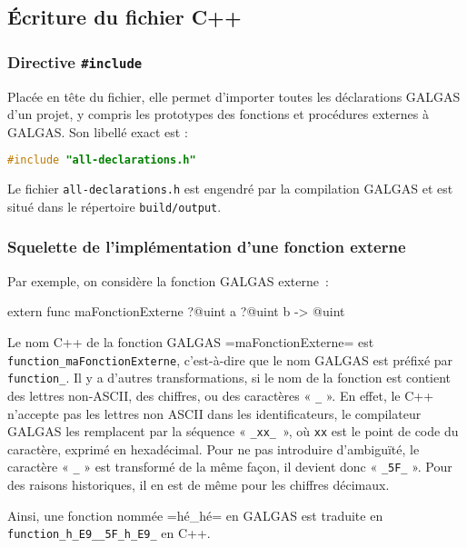 \subsection{Écriture du fichier C++}


\subsubsection{Directive \texttt{\#include}}

Placée en tête du fichier, elle permet d'importer toutes les déclarations GALGAS d'un projet, y compris les prototypes des fonctions et procédures externes à GALGAS. Son libellé exact est :

\begin{lstlisting}[language=C++]
#include "all-declarations.h"
\end{lstlisting}

Le fichier \texttt{all-declarations.h} est engendré par la compilation GALGAS et est situé dans le répertoire \texttt{build/output}.



\subsubsection{Squelette de l'implémentation d'une fonction externe}

Par exemple, on considère la fonction GALGAS externe~:
\begin{galgas}
extern func maFonctionExterne ?@uint a ?@uint b -> @uint 
\end{galgas}

Le nom C++ de la fonction GALGAS \ggs=maFonctionExterne= est \texttt{function\_maFonctionExterne}, c'est-à-dire que le nom GALGAS est préfixé par \texttt{function\_}. Il y a d'autres transformations, si le nom de la fonction est contient des lettres non-ASCII, des chiffres, ou des caractères « \texttt{\_} ». En effet, le C++ n'accepte pas les lettres non ASCII dans les identificateurs, le compilateur GALGAS les remplacent par la séquence « \texttt{\_xx\_ }», où \texttt{xx} est le point de code du caractère, exprimé en hexadécimal. Pour ne pas introduire d'ambiguïté, le caractère « \texttt{\_} » est transformé de la même façon, il devient donc « \texttt{\_5F\_} ». Pour des raisons historiques, il en est de même pour les chiffres décimaux.

Ainsi, une fonction nommée \ggs=hé_hé= en GALGAS est traduite en \texttt{function\_h\_E9\_\_5F\_h\_E9\_} en C++.

